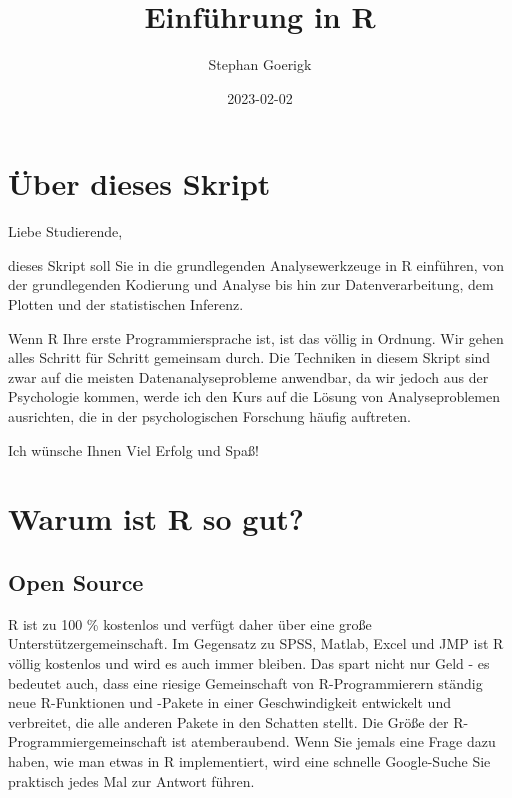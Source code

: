 \documentclass[
]{book}
\title{Einführung in R}
\author{Stephan Goerigk}
\date{2023-02-02}
\begin{document}
\maketitle

{
\setcounter{tocdepth}{1}
\tableofcontents
}
\hypertarget{uxfcber-dieses-skript}{%
\chapter*{Über dieses Skript}\label{uxfcber-dieses-skript}}

Liebe Studierende,

dieses Skript soll Sie in die grundlegenden Analysewerkzeuge in R einführen, von der grundlegenden Kodierung und Analyse bis hin zur Datenverarbeitung, dem Plotten und der statistischen Inferenz.

Wenn R Ihre erste Programmiersprache ist, ist das völlig in Ordnung. Wir gehen alles Schritt für Schritt gemeinsam durch. Die Techniken in diesem Skript sind zwar auf die meisten Datenanalyseprobleme anwendbar, da wir jedoch aus der Psychologie kommen, werde ich den Kurs auf die Lösung von Analyseproblemen ausrichten, die in der psychologischen Forschung häufig auftreten.

Ich wünsche Ihnen Viel Erfolg und Spaß!

\hypertarget{warum-ist-r-so-gut}{%
\chapter{Warum ist R so gut?}\label{warum-ist-r-so-gut}}

\hypertarget{open-source}{%
\section{Open Source}\label{open-source}}

R ist zu 100 \% kostenlos und verfügt daher über eine große Unterstützergemeinschaft. Im Gegensatz zu SPSS, Matlab, Excel und JMP ist R völlig kostenlos und wird es auch immer bleiben. Das spart nicht nur Geld - es bedeutet auch, dass eine riesige Gemeinschaft von R-Programmierern ständig neue R-Funktionen und -Pakete in einer Geschwindigkeit entwickelt und verbreitet, die alle anderen Pakete in den Schatten stellt. Die Größe der R-Programmiergemeinschaft ist atemberaubend. Wenn Sie jemals eine Frage dazu haben, wie man etwas in R implementiert, wird eine schnelle Google-Suche Sie praktisch jedes Mal zur Antwort führen.
\end{document}

